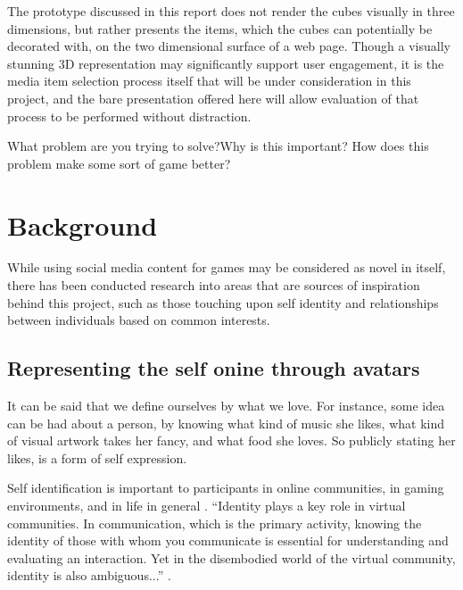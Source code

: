 \documentclass[]{article}
\begin{document}
The prototype discussed in this report does not render the cubes visually in three dimensions, but rather presents the items, which the cubes can potentially be decorated with, on the two dimensional surface of a web page.  Though a visually stunning 3D representation may significantly support user engagement, it is the media item selection process itself that will be under consideration in this project, and the bare presentation offered here will allow evaluation of that process to be performed without distraction.

\begin{framed}
What problem are you trying to solve?Why is this important? How does this problem make some sort of game better?
\end{framed}

\section{Background}
\label{sec:Background}

While using social media content for games may be considered as novel in itself, there has been conducted research into areas that are sources of inspiration behind this project, such as those touching upon self identity and relationships between individuals based on common interests.


\subsection{Representing the self onine through avatars}

It can be said that we define ourselves by what we love.  For instance, some idea can be had about a person, by knowing what kind of music she likes, what kind of visual artwork takes her fancy, and what food she loves.  So publicly stating her likes, is a form of self expression.


Self identification is important to participants in online communities, in gaming environments, and in life in general \cite{marwick2005selling}.  “Identity plays a key role in virtual communities. In communication, which is the primary activity, knowing the identity of those with whom you communicate is essential for understanding and evaluating an interaction.  Yet in the disembodied world of the virtual community, identity is also ambiguous...” \cite{kollock2002communities}.
\end{document}
